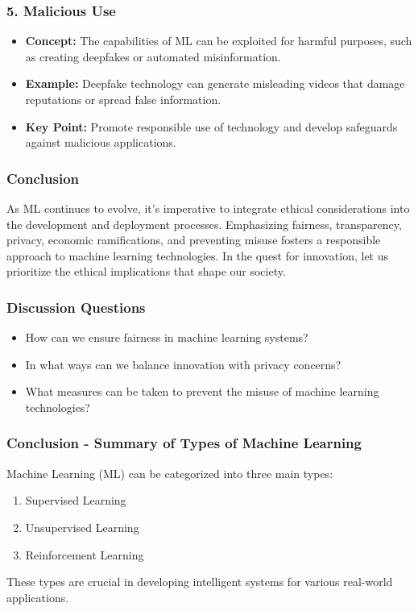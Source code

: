 \documentclass[aspectratio=169]{beamer}
\begin{document}
\begin{frame}[fragile]
    \frametitle{5. Malicious Use}
    \begin{itemize}
        \item \textbf{Concept:} The capabilities of ML can be exploited for harmful purposes, such as creating deepfakes or automated misinformation.
        \item \textbf{Example:} Deepfake technology can generate misleading videos that damage reputations or spread false information.
        \item \textbf{Key Point:} Promote responsible use of technology and develop safeguards against malicious applications.
    \end{itemize}
\end{frame}

\begin{frame}[fragile]
    \frametitle{Conclusion}
    As ML continues to evolve, it's imperative to integrate ethical considerations into the development and deployment processes. Emphasizing fairness, transparency, privacy, economic ramifications, and preventing misuse fosters a responsible approach to machine learning technologies. In the quest for innovation, let us prioritize the ethical implications that shape our society.
\end{frame}

\begin{frame}[fragile]
    \frametitle{Discussion Questions}
    \begin{itemize}
        \item How can we ensure fairness in machine learning systems?
        \item In what ways can we balance innovation with privacy concerns?
        \item What measures can be taken to prevent the misuse of machine learning technologies?
    \end{itemize}
\end{frame}

\begin{frame}[fragile]
    \frametitle{Conclusion - Summary of Types of Machine Learning}
    Machine Learning (ML) can be categorized into three main types:
    \begin{enumerate}
        \item Supervised Learning
        \item Unsupervised Learning
        \item Reinforcement Learning
    \end{enumerate}
    These types are crucial in developing intelligent systems for various real-world applications.
\end{frame}
\end{document}
